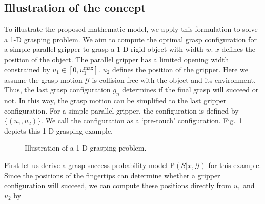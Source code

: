 \subsection{Illustration of the concept}
To illustrate the proposed mathematic model, we apply this formulation to solve a 1-D grasping problem. We aim to compute the optimal grasp configuration for a simple parallel gripper to grasp a 1-D rigid  object with width $w$. $x$ defines the position of the object. The parallel gripper has a limited opening width constrained by $u_1 \in [0, u_{1}^{\text{max}}]$. $u_2$ defines the position of the gripper. Here we assume the grasp motion $\mathcal{G}$ is collision-free with the object and its environment. Thus, the last grasp configuration $g_n$ determines if the final grasp will succeed or not. In this way, the grasp motion  can be simplified to the last gripper configuration. For a simple parallel gripper, the configuration is defined by $\{ (u_1,u_2) \}$. We call the  configuration as a `pre-touch' configuration. Fig.~\ref{fig:1D_simple} depicts this 1-D grasping example.

\begin{figure}[!htbp]
\centering
\def\svgwidth{0.8\linewidth}

\captionsetup{justification=raggedright}
\caption{Illustration of a 1-D grasping problem.}
\label{fig:1D_simple}
\end{figure}	

First let us  derive a grasp success probability model $\text{P}(S | x,  \mathcal{G} )$ for this example. Since the positions of the fingertips can determine whether a gripper configuration will succeed, we can compute these positions directly from $u_1$ and $u_2$ by   

